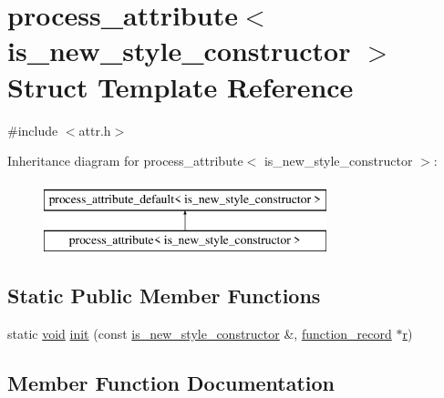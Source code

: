 \hypertarget{structprocess__attribute_3_01is__new__style__constructor_01_4}{}\section{process\+\_\+attribute$<$ is\+\_\+new\+\_\+style\+\_\+constructor $>$ Struct Template Reference}
\label{structprocess__attribute_3_01is__new__style__constructor_01_4}


{\ttfamily \#include $<$attr.\+h$>$}

Inheritance diagram for process\+\_\+attribute$<$ is\+\_\+new\+\_\+style\+\_\+constructor $>$\+:\begin{figure}[H]
\begin{center}
\leavevmode
\includegraphics[height=2.000000cm]{structprocess__attribute_3_01is__new__style__constructor_01_4}
\end{center}
\end{figure}
\subsection*{Static Public Member Functions}
\begin{DoxyCompactItemize}
\item 
static \mbox{\hyperlink{_s_d_l__opengles2__gl2ext_8h_ae5d8fa23ad07c48bb609509eae494c95}{void}} \mbox{\hyperlink{structprocess__attribute_3_01is__new__style__constructor_01_4_a3765ebda0b24180fcba45c070df706af}{init}} (const \mbox{\hyperlink{structis__new__style__constructor}{is\+\_\+new\+\_\+style\+\_\+constructor}} \&, \mbox{\hyperlink{structfunction__record}{function\+\_\+record}} $\ast$\mbox{\hyperlink{_s_d_l__opengl_8h_a42ce7cdc612e53abee15043f80220d97}{r}})
\end{DoxyCompactItemize}


\subsection{Member Function Documentation}
\mbox{\label{structprocess__attribute_3_01is__new__style__constructor_01_4_a3765ebda0b24180fcba45c070df706af}} 
